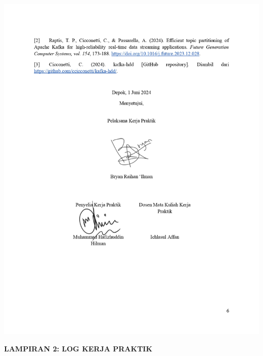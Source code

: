 \includegraphics[width=1\textwidth]{assets/pics/KAKP_Bryan Raihan Ilman_2106704351_signed_page-0006.jpg}

\begin{center}
    \textbf{\large LAMPIRAN 2: LOG KERJA PRAKTIK}
\end{center}

